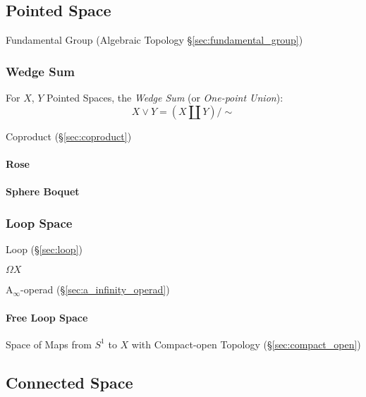 \subsection{Pointed Space}\label{sec:pointed_space}

\fist Fundamental Group (Algebraic Topology \S\ref{sec:fundamental_group})



\subsubsection{Wedge Sum}\label{sec:wedge_sum}

For $X$, $Y$ Pointed Spaces, the \emph{Wedge Sum} (or \emph{One-point
  Union}):
\[
  X \vee Y = (X \amalg Y) / \sim
\]

Coproduct (\S\ref{sec:coproduct})



\paragraph{Rose}\label{sec:rose}\hfill

\paragraph{Sphere Boquet}\label{sec:sphere_boquet}\hfill



\subsubsection{Loop Space}\label{sec:loop_space}

Loop (\S\ref{sec:loop})

$\Omega X$

A$_\infty$-operad (\S\ref{sec:a_infinity_operad})



\paragraph{Free Loop Space}\label{sec:free_loop_space}\hfill

Space of Maps from $S^1$ to $X$ with Compact-open Topology
(\S\ref{sec:compact_open})



\subsection{Connected Space}\label{sec:connected_space}

